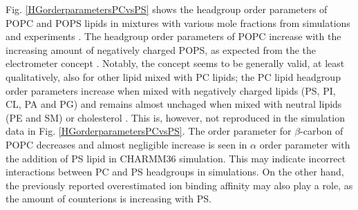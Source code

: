 \documentclass[aps,prl,superscriptaddress,twocolumn]{revtex4}
\begin{document}
Fig. \ref{HGorderparametersPCvsPS} shows the headgroup order parameters
of POPC and POPS lipids in mixtures with various mole fractions from 
simulations and experiments \cite{scherer87,roux90}.
The headgroup order parameters of POPC increase with the increasing
amount of negatively charged POPS, as expected from the 
the electrometer concept \cite{seelig87}. Notably, the concept
seems to be generally valid, at least qualitatively, also for 
other lipid mixed with PC lipids; the PC lipid headgroup order
parameters increase when mixed with negatively charged 
lipids (PS, PI, CL, PA and PG) and remains almost unchaged when 
mixed with neutral lipids (PE and SM) \cite{scherer87} or cholesterol \cite{ferreira13}.
This is, however, not reproduced in the simulation data 
in Fig. \ref{HGorderparametersPCvsPS}. The order parameter for
$\beta$-carbon of POPC decreases and almost negligible increase is 
seen in $\alpha$ order parameter with the addition of PS lipid in CHARMM36 simulation.
This may indicate incorrect interactions between PC and PS headgroups
in simulations. On the other hand, the previously reported overestimated
ion binding affinity may also play a role, as the amount of counterions
is increasing with PS.
\end{document}
